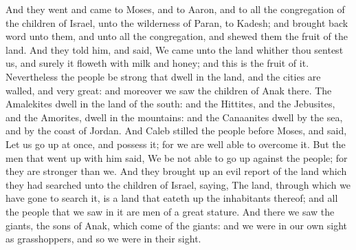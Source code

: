 \begin{biblechapter}
 And they went and came to Moses, and to Aaron, and to all the congregation of the children of Israel, unto the wilderness of Paran, to Kadesh; and brought back word unto them, and unto all the congregation, and shewed them the fruit of the land.
\verse And they told him, and said, We came unto the land whither thou sentest us, and surely it floweth with milk and honey; and this is the fruit of it.
\verse Nevertheless the people be strong that dwell in the land, and the cities are walled, and very great: and moreover we saw the children of Anak there.
\verse The Amalekites dwell in the land of the south: and the Hittites, and the Jebusites, and the Amorites, dwell in the mountains: and the Canaanites dwell by the sea, and by the coast of Jordan.
\verse And Caleb stilled the people before Moses, and said, Let us go up at once, and possess it; for we are well able to overcome it.
\verse But the men that went up with him said, We be not able to go up against the people; for they are stronger than we.
\verse And they brought up an evil report of the land which they had searched unto the children of Israel, saying, The land, through which we have gone to search it, is a land that eateth up the inhabitants thereof; and all the people that we saw in it are men of a great stature.
\verse And there we saw the giants, the sons of Anak, which come of the giants: and we were in our own sight as grasshoppers, and so we were in their sight.
\end{biblechapter}

